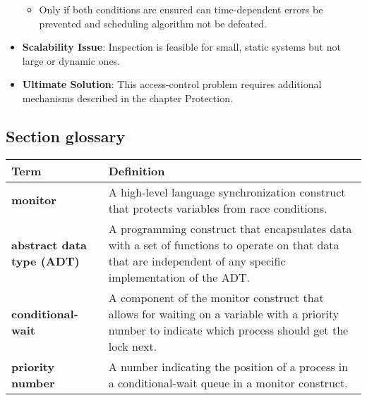 \begin{itemize}
\begin{itemize}
\begin{enumerate}
        \end{enumerate}
        \item Only if both conditions are ensured can time-dependent errors be prevented and scheduling algorithm not be defeated.
    \end{itemize}
    \item \textbf{Scalability Issue}: Inspection is feasible for small, static systems but not large or dynamic ones.
    \item \textbf{Ultimate Solution}: This access-control problem requires additional mechanisms described in the chapter Protection.
\end{itemize}

\subsection*{Section glossary}
\centering
\begin{tabular}{>{\raggedright}p{} >{\raggedright\arraybackslash}p{}}
\toprule
\textbf{Term} & \textbf{Definition} \\
\midrule
\textbf{monitor} & A high-level language synchronization construct that protects variables from race conditions. \\
\textbf{abstract data type (ADT)} & A programming construct that encapsulates data with a set of functions to operate on that data that are independent of any specific implementation of the ADT. \\
\textbf{conditional-wait} & A component of the monitor construct that allows for waiting on a variable with a priority number to indicate which process should get the lock next. \\
\textbf{priority number} & A number indicating the position of a process in a conditional-wait queue in a monitor construct. \\
\bottomrule
\end{tabular}
\vspace{\baselineskip}
